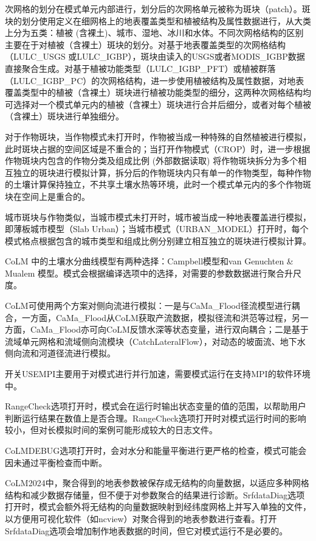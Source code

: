 次网格的划分在模式单元内部进行，划分后的次网格单元被称为斑块（patch）。斑块的划分使用定义在细网格上的地表覆盖类型和植被结构及属性数据进行，从大类上分为五类：植被 (含裸土)、城市、湿地、冰川和水体。不同次网格结构的区别主要在于对植被（含裸土）斑块的划分。对基于地表覆盖类型的次网格结构（LULC\_USGS 或LULC\_IGBP），斑块由读入的USGS或者MODIS\_IGBP数据直接聚合生成。对基于植被功能类型（LULC\_IGBP\_PFT）或植被群落（LULC\_IGBP\_PC）的次网格结构，进一步使用植被结构及属性数据，对地表覆盖类型中的植被（含裸土）斑块进行植被功能类型的细分，这两种次网格结构均可选择对一个模式单元内的植被（含裸土）斑块进行合并后细分，或者对每个植被（含裸土）斑块进行单独细分。

对于作物斑块，当作物模式未打开时，作物被当成一种特殊的自然植被进行模拟，此时斑块占据的空间区域是不重合的；当打开作物模式（CROP）时，进一步根据作物斑块内包含的作物分类及组成比例 (外部数据读取) 将作物斑块拆分为多个相互独立的斑块进行模拟计算，拆分后的作物斑块内只有单一的作物类型，每种作物的土壤计算保持独立，不共享土壤水热等环境，此时一个模式单元内的多个作物斑块在空间上是重合的。

城市斑块与作物类似，当城市模式未打开时，城市被当成一种地表覆盖进行模拟，即薄板城市模型（Slab Urban）；当城市模式（URBAN\_MODEL）打开时，每个模式格点根据包含的城市类型和组成比例分别建立相互独立的斑块进行模拟计算。

CoLM 中的土壤水分曲线模型有两种选择：Campbell模型和van Genuchten \& Mualem 模型。模式会根据编译选项中的选择，对需要的参数数据进行聚合升尺度。

CoLM可使用两个方案对侧向流进行模拟：一是与CaMa\_Flood径流模型进行耦合，一方面，CaMa\_Flood从CoLM获取产流数据，模拟径流和洪范等过程，另一方面，CaMa\_Flood亦可向CoLM反馈水深等状态变量，进行双向耦合；二是基于流域单元网格和流域侧向流模块（CatchLateralFlow），对动态的坡面流、地下水侧向流和河道径流进行模拟。

开关USEMPI主要用于对模式进行并行加速，需要模式运行在支持MPI的软件环境中。

RangeCheck选项打开时，模式会在运行时输出状态变量的值的范围，以帮助用户判断运行结果在数值上是否合理。RangeCheck选项打开时对模式运行时间的影响较小，但对长模拟时间的案例可能形成较大的日志文件。

CoLMDEBUG选项打开时，会对水分和能量平衡进行更严格的检查，模式可能会因未通过平衡检查而中断。

CoLM2024中，聚合得到的地表参数被保存成无结构的向量数据，以适应多种网格结构和减少数据存储量，但不便于对参数聚合的结果进行诊断。SrfdataDiag选项打开时，模式会额外将无结构的向量数据映射到经纬度网格上并写入单独的文件，以方便用可视化软件（如ncview）对聚合得到的地表参数进行查看。打开SrfdataDiag选项会增加制作地表数据的时间，但它对模式运行不是必要的。


